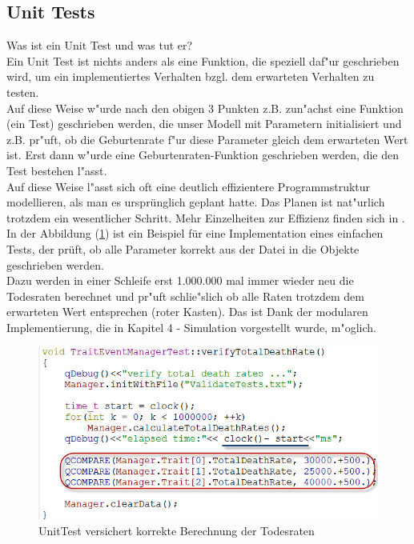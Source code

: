 \documentclass[11pt, a4paper, german]{article}
\theoremstyle{plain}
\begin{document}
	\subsection{Unit Tests}
	Was ist ein Unit Test und was tut er?\\
	Ein Unit Test ist nichts anders als eine Funktion, die speziell daf"ur geschrieben wird, um ein implementiertes Verhalten bzgl. dem erwarteten Verhalten zu testen.\\
	Auf diese Weise w"urde nach den obigen 3 Punkten z.B. zun"achst eine Funktion (ein Test) geschrieben werden, die unser Modell mit Parametern initialisiert und z.B. pr"uft, ob die Geburtenrate f"ur diese Parameter gleich dem erwarteten Wert ist. Erst dann w"urde eine Geburtenraten-Funktion geschrieben werden, die den Test bestehen l"asst.\\ 
	Auf diese Weise l"asst sich oft eine deutlich effizientere Programmstruktur modellieren, als man es ursprünglich geplant hatte. Das Planen ist nat"urlich trotzdem ein wesentlicher Schritt. Mehr Einzelheiten zur Effizienz finden sich in \cite[The Bowling Game: An example of test-first pair programming]{martin2008clean}.\\
	In der Abbildung (\ref{Unit Test}) ist ein Beispiel für eine Implementation eines einfachen Tests, der prüft, ob alle Parameter korrekt aus der Datei in die Objekte geschrieben werden.\\
	Dazu werden in einer Schleife erst 1.000.000 mal immer wieder neu die Todesraten berechnet und pr"uft schlie"slich ob alle Raten trotzdem dem erwarteten Wert entsprechen (roter Kasten). Das ist Dank der modularen Implementierung, die in Kapitel 4 - Simulation vorgestellt wurde, m"oglich.
	\begin{figure}[H]
		\centering
		\includegraphics[width=1 \linewidth]{./Pictures/UnitTest_death}
		\caption[UnitTest]{UnitTest versichert korrekte Berechnung der Todesraten}
		\label{Unit Test}
	\end{figure}
\end{document}
